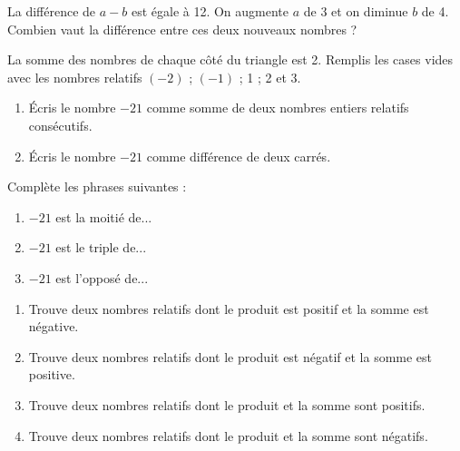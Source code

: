 \begin{exercice}
La différence de $a-b$ est égale à 12. On augmente $a$ de 3 et on diminue $b$ de 4. Combien vaut la différence entre ces deux nouveaux nombres ?
\end{exercice}


\begin{exercice}
La somme des nombres de chaque côté du triangle est 2. Remplis les cases vides avec les nombres relatifs $(-2)$ ; $(-1)$ ; 1 ; 2 et 3.
\begin{center}
\end{center}
\end{exercice}


\begin{exercice}[Le nombre $-21$...]
\begin{enumerate}
\item Écris le nombre $-21$ comme somme de deux nombres entiers relatifs consécutifs.
\item Écris le nombre $-21$ comme différence de deux carrés.
\end{enumerate}
\end{exercice}


\begin{exercice}
Complète les phrases suivantes :
\begin{enumerate}
\item $-21$ est la moitié de...
\item $-21$ est le triple de...
\item $-21$ est l'opposé de...
\end{enumerate}
\end{exercice}


\begin{exercice}
\begin{enumerate}
\item Trouve deux nombres relatifs dont le produit est positif et la somme est négative.
\item Trouve deux nombres relatifs dont le produit est négatif et la somme est positive.
\item Trouve deux nombres relatifs dont le produit et la somme sont positifs.
\item Trouve deux nombres relatifs dont le produit et la somme sont négatifs.
\end{enumerate}
\end{exercice}



